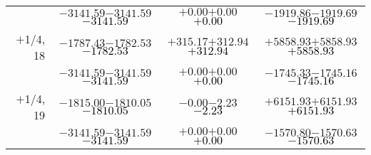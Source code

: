 \documentclass[compress]{beamer}
\begin{document}
\begin{frame}
{\begin{tabular}{r | c | c | c}
           & $-3141.59$\hspace{0.1 cm}$-3141.59$\hspace{0.1 cm}\textcolor{black}{$-3141.59$} & $+0.00$\hspace{0.1 cm}$+0.00$\hspace{0.1 cm}\textcolor{black}{$+0.00$} & $-1919.86$\hspace{0.1 cm}$-1919.69$\hspace{0.1 cm}\textcolor{black}{$-1919.69$} \\
$+$1/4, 18 & $-1787.43$\hspace{0.1 cm}$-1782.53$\hspace{0.1 cm}\textcolor{black}{$-1782.53$} & $+315.17$\hspace{0.1 cm}$+312.94$\hspace{0.1 cm}\textcolor{black}{$+312.94$} & $+5858.93$\hspace{0.1 cm}$+5858.93$\hspace{0.1 cm}\textcolor{black}{$+5858.93$} \\
           & $-3141.59$\hspace{0.1 cm}$-3141.59$\hspace{0.1 cm}\textcolor{black}{$-3141.59$} & $+0.00$\hspace{0.1 cm}$+0.00$\hspace{0.1 cm}\textcolor{black}{$+0.00$} & $-1745.33$\hspace{0.1 cm}$-1745.16$\hspace{0.1 cm}\textcolor{black}{$-1745.16$} \\
$+$1/4, 19 & $-1815.00$\hspace{0.1 cm}$-1810.05$\hspace{0.1 cm}\textcolor{black}{$-1810.05$} & $-0.00$\hspace{0.1 cm}$-2.23$\hspace{0.1 cm}\textcolor{black}{$-2.23$} & $+6151.93$\hspace{0.1 cm}$+6151.93$\hspace{0.1 cm}\textcolor{black}{$+6151.93$} \\
           & $-3141.59$\hspace{0.1 cm}$-3141.59$\hspace{0.1 cm}\textcolor{black}{$-3141.59$} & $+0.00$\hspace{0.1 cm}$+0.00$\hspace{0.1 cm}\textcolor{black}{$+0.00$} & $-1570.80$\hspace{0.1 cm}$-1570.63$\hspace{0.1 cm}\textcolor{black}{$-1570.63$} \\

\end{tabular}}
\end{frame}
\end{document}
